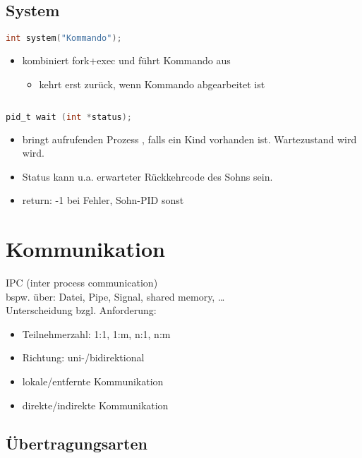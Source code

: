 \section{System}
\begin{lstlisting}[language=C]
int system("Kommando");
\end{lstlisting}
\begin{itemize}
\item kombiniert fork+exec und führt Kommando aus
\begin{itemize}[label=$\to$]
\item kehrt erst zurück, wenn Kommando abgearbeitet ist
\end{itemize}
\end{itemize}
\section[Wait]{}
\begin{lstlisting}[language=C]
pid_t wait (int *status);
\end{lstlisting}
\begin{itemize}
\item bringt aufrufenden Prozess , falls ein Kind vorhanden ist. Wartezustand wird  wird.
\item Status kann u.a. erwarteter Rückkehrcode des Sohns sein.
\item return: -1 bei Fehler, Sohn-PID sonst
\end{itemize}
\chapter{Kommunikation}
IPC (inter process communication)\\
bspw. über: Datei, Pipe, Signal, shared memory, …\\
Unterscheidung bzgl. Anforderung:
\begin{itemize}
\item Teilnehmerzahl: 1:1, 1:m, n:1, n:m
\item Richtung: uni-/bidirektional
\item lokale/entfernte Kommunikation
\item direkte/indirekte Kommunikation
\end{itemize}
\section{Übertragungsarten}
